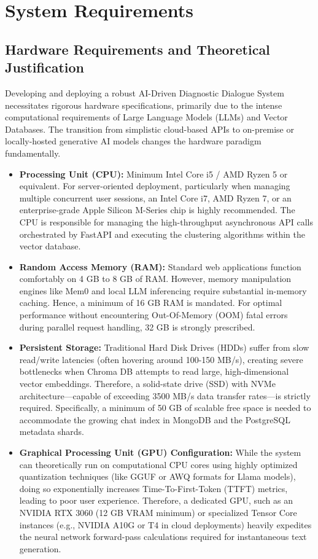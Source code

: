\documentclass[12pt]{article}
\begin{document}
\newpage
\section{System Requirements}

\subsection{Hardware Requirements and Theoretical Justification}
Developing and deploying a robust AI-Driven Diagnostic Dialogue System necessitates rigorous hardware specifications, primarily due to the intense computational requirements of Large Language Models (LLMs) and Vector Databases. The transition from simplistic cloud-based APIs to on-premise or locally-hosted generative AI models changes the hardware paradigm fundamentally.

\begin{itemize}
    \item \textbf{Processing Unit (CPU):} Minimum Intel Core i5 / AMD Ryzen 5 or equivalent. For server-oriented deployment, particularly when managing multiple concurrent user sessions, an Intel Core i7, AMD Ryzen 7, or an enterprise-grade Apple Silicon M-Series chip is highly recommended. The CPU is responsible for managing the high-throughput asynchronous API calls orchestrated by FastAPI and executing the clustering algorithms within the vector database.
    \item \textbf{Random Access Memory (RAM):} Standard web applications function comfortably on 4 GB to 8 GB of RAM. However, memory manipulation engines like Mem0 and local LLM inferencing require substantial in-memory caching. Hence, a minimum of 16 GB RAM is mandated. For optimal performance without encountering Out-Of-Memory (OOM) fatal errors during parallel request handling, 32 GB is strongly prescribed.
    \item \textbf{Persistent Storage:} Traditional Hard Disk Drives (HDDs) suffer from slow read/write latencies (often hovering around 100-150 MB/s), creating severe bottlenecks when Chroma DB attempts to read large, high-dimensional vector embeddings. Therefore, a solid-state drive (SSD) with NVMe architecture—capable of exceeding 3500 MB/s data transfer rates—is strictly required. Specifically, a minimum of 50 GB of scalable free space is needed to accommodate the growing chat index in MongoDB and the PostgreSQL metadata shards.
    \item \textbf{Graphical Processing Unit (GPU) Configuration:} While the system can theoretically run on computational CPU cores using highly optimized quantization techniques (like GGUF or AWQ formats for Llama models), doing so exponentially increases Time-To-First-Token (TTFT) metrics, leading to poor user experience. Therefore, a dedicated GPU, such as an NVIDIA RTX 3060 (12 GB VRAM minimum) or specialized Tensor Core instances (e.g., NVIDIA A10G or T4 in cloud deployments) heavily expedites the neural network forward-pass calculations required for instantaneous text generation.
\end{itemize}
\end{document}

